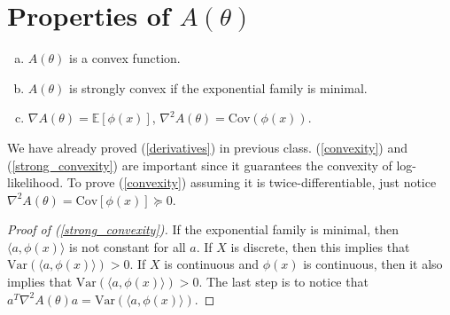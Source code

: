 \documentclass[11pt]{article}
\newcommand{\E}{\mathbb{E}}
\newcommand{\1}{\mathbbm{1}}
\begin{document}
\section{Properties of $A(\theta)$}
\begin{enumerate}[(a)]
\item \label{convexity}
$A(\theta)$ is a convex function.
\item \label{strong_convexity}
$A(\theta)$ is strongly convex if the exponential family is minimal.
\item \label{derivatives}
$\nabla A(\theta) = \E[\phi(x)]$, $\nabla^2 A(\theta) = \mathrm{Cov} (\phi(x))$.
\end{enumerate}
We have already proved (\ref{derivatives}) in previous class. (\ref{convexity}) and (\ref{strong_convexity})
are important since it guarantees the convexity of log-likelihood. To prove (\ref{convexity}) assuming
it is twice-differentiable, just notice $\nabla^2 A(\theta) = \mathrm{Cov} [\phi(x)] \succeq 0$.
\begin{proof}[Proof of (\ref{strong_convexity})]
If the exponential family is minimal, then $\langle a, \phi(x) \rangle$ is not constant for all $a$. If $X$
is discrete, then this implies that $\mathrm{Var} (\langle a, \phi(x) \rangle) > 0$. If $X$ is continuous and
$\phi(x)$ is continuous, then it also implies that $\mathrm{Var} (\langle a, \phi(x) \rangle) > 0$. The last
step is to notice that $a^T \nabla^2 A(\theta) a = \mathrm{Var}(\langle a, \phi(x) \rangle)$.
\end{proof}
\end{document}

